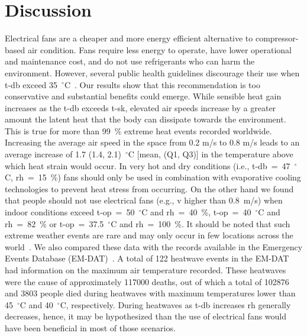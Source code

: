 
\section{Discussion}\label{sec:discussion}

Electrical fans are a cheaper and more energy efficient alternative to compressor-based air condition.
Fans require less energy to operate, have lower operational and maintenance cost, and do not use refrigerants who can harm the environment.
However, several public health guidelines discourage their use when \acf{t-db} exceed 35~$^{\circ}$C~\cite{WMO2015}.
Our results show that this recommendation is too conservative and substantial benefits could emerge.
While sensible heat gain increases as the \ac{t-db} exceeds \acf{t-sk}, elevated air speeds increase by a greater amount the latent heat that the body can dissipate towards the environment.
This is true for more than 99~\% extreme heat events recorded worldwide.
Increasing the average air speed in the space from 0.2 m/s to 0.8 m/s leads to an average increase of 1.7 (1.4, 2.1)~$^{\circ}$C [mean, (Q1, Q3)] in the temperature above which heat strain would occur.
In very hot and dry conditions (i.e., \ac{t-db}~=~47~$^{\circ}$C, \ac{rh}~=~15~\%) fans should only be used in combination with evaporative cooling technologies to prevent heat stress from occurring.
On the other hand we found that people should not use electrical fans (e.g., \ac{v} higher than 0.8~m/s) when indoor conditions exceed \ac{t-op}~=~50~$^{\circ}$C and \ac{rh}~=~40~\%, \ac{t-op}~=~40~$^{\circ}$C and \ac{rh}~=~82~\% or \ac{t-op}~=~37.5~$^{\circ}$C and \ac{rh}~=~100~\%.
It should be noted that such extreme weather events are rare and may only occur in few locations across the world~\cite{ASHRA2017}.
We also compared these data with the records available in the Emergency Events Database (EM-DAT)~\cite{EMDATThe70:online}.
A total of 122 heatwave events in the EM-DAT had information on the maximum air temperature recorded.
These heatwaves were the cause of approximately 117000 deaths, out of which a total of 102876 and 3803 people died during heatwaves with maximum temperatures lower than 45~$^{\circ}$C and 40~$^{\circ}$C, respectively.
During heatwaves as \ac{t-db} increases \ac{rh} generally decreases, hence, it may be hypothesized than the use of electrical fans would have been beneficial in most of those scenarios.


